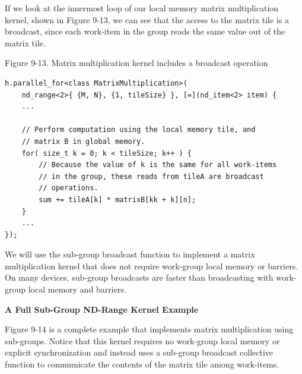 If we look at the innermost loop of our local memory matrix multiplication kernel, shown in Figure 9-13, we can see that the access to the matrix tile is a broadcast, since each work-item in the group reads the same value out of the matrix tile.\par

\hspace*{\fill} \par %
Figure 9-13. Matrix multiplication kernel includes a broadcast operation
\begin{lstlisting}[caption={}]
h.parallel_for<class MatrixMultiplication>(
	nd_range<2>{ {M, N}, {1, tileSize} }, [=](nd_item<2> item) {
	...
	
	// Perform computation using the local memory tile, and
	// matrix B in global memory.
	for( size_t k = 0; k < tileSize; k++ ) {
		// Because the value of k is the same for all work-items
		// in the group, these reads from tileA are broadcast
		// operations.
		sum += tileA[k] * matrixB[kk + k][n];
	}
	...
});
\end{lstlisting}

We will use the sub-group broadcast function to implement a matrix multiplication kernel that does not require work-group local memory or barriers. On many devices, sub-group broadcasts are faster than broadcasting with work-group local memory and barriers.\par

\hspace*{\fill} \par %
\textbf{A Full Sub-Group ND-Range Kernel Example}

Figure 9-14 is a complete example that implements matrix multiplication using sub-groups. Notice that this kernel requires no work-group local memory or explicit synchronization and instead uses a sub-group broadcast collective function to communicate the contents of the matrix tile among work-items.\par

